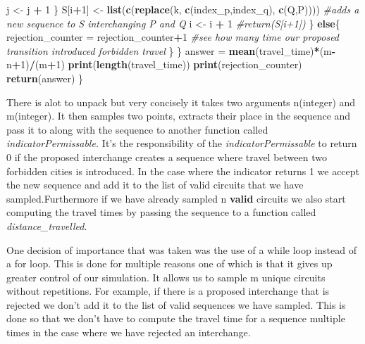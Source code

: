 \documentclass[
]{article}
\newenvironment{Shaded}{\begin{snugshade}}{\end{snugshade}}
\newcommand{\CommentTok}[1]{\textcolor[rgb]{0.56,0.35,0.01}{\textit{#1}}}
\newcommand{\ControlFlowTok}[1]{\textcolor[rgb]{0.13,0.29,0.53}{\textbf{#1}}}
\newcommand{\DecValTok}[1]{\textcolor[rgb]{0.00,0.00,0.81}{#1}}
\newcommand{\KeywordTok}[1]{\textcolor[rgb]{0.13,0.29,0.53}{\textbf{#1}}}
\newcommand{\NormalTok}[1]{#1}
\newcommand{\OperatorTok}[1]{\textcolor[rgb]{0.81,0.36,0.00}{\textbf{#1}}}
\newcommand{\StringTok}[1]{\textcolor[rgb]{0.31,0.60,0.02}{#1}}
\begin{document}
\begin{Shaded}
\begin{Highlighting}[]
\NormalTok{      j <-}\StringTok{ }\NormalTok{j }\OperatorTok{+}\StringTok{ }\DecValTok{1}
\NormalTok{    \}}
\NormalTok{    S[i}\OperatorTok{+}\DecValTok{1}\NormalTok{] <-}\StringTok{ }\KeywordTok{list}\NormalTok{(}\KeywordTok{c}\NormalTok{(}\KeywordTok{replace}\NormalTok{(k, }\KeywordTok{c}\NormalTok{(index_p,index_q), }\KeywordTok{c}\NormalTok{(Q,P)))) }\CommentTok{#adds a new sequence to S interchanging P and Q }
\NormalTok{    i <-}\StringTok{ }\NormalTok{i }\OperatorTok{+}\StringTok{ }\DecValTok{1}
    \CommentTok{#return(S[i+1])}
\NormalTok{  \}}
  \ControlFlowTok{else}\NormalTok{\{}
\NormalTok{    rejection_counter =}\StringTok{ }\NormalTok{rejection_counter}\OperatorTok{+}\DecValTok{1} \CommentTok{#see how many time our proposed transition introduced forbidden travel}
\NormalTok{  \}}
\NormalTok{\}}
\NormalTok{   answer =}\StringTok{ }\KeywordTok{mean}\NormalTok{(travel_time)}\OperatorTok{*}\NormalTok{(m}\OperatorTok{-}\NormalTok{n}\OperatorTok{+}\DecValTok{1}\NormalTok{)}\OperatorTok{/}\NormalTok{(m}\OperatorTok{+}\DecValTok{1}\NormalTok{)}
   \KeywordTok{print}\NormalTok{(}\KeywordTok{length}\NormalTok{(travel_time))}
   \KeywordTok{print}\NormalTok{(rejection_counter)}
   \KeywordTok{return}\NormalTok{(answer)}
\NormalTok{\}}
\end{Highlighting}
\end{Shaded}

There is alot to unpack but very concisely it takes two arguments
n(integer) and m(integer). It then samples two points, extracts their
place in the sequence and pass it to along with the sequence to another
function called \emph{indicatorPermissable.} It's the responsibility of
the \emph{indicatorPermissable} to return 0 if the proposed interchange
creates a sequence where travel between two forbidden cities is
introduced. In the case where the indicator returns 1 we accept the new
sequence and add it to the list of valid circuits that we have
sampled.Furthermore if we have already sampled n \textbf{valid} circuits
we also start computing the travel times by passing the sequence to a
function called \emph{distance\_travelled}.

One decision of importance that was taken was the use of a while loop
instead of a for loop. This is done for multiple reasons one of which is
that it gives up greater control of our simulation. It allows us to
sample m unique circuits without repetitions. For example, if there is a
proposed interchange that is rejected we don't add it to the list of
valid sequences we have sampled. This is done so that we don't have to
compute the travel time for a sequence multiple times in the case where
we have rejected an interchange.
\end{document}
